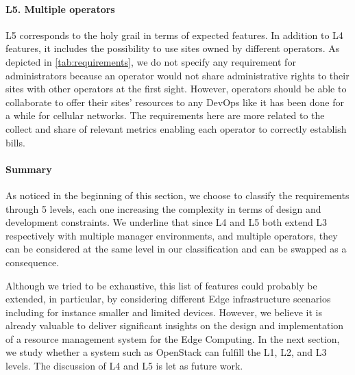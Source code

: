 \paragraph{L5. Multiple operators}
L5 corresponds to the holy grail in terms of expected features. In
addition to L4 features, it includes the possibility to use sites
owned by different operators. As depicted in \cref{tab:requirements},
we do not specify any requirement for administrators because an
operator would not share administrative rights to their sites with
other operators at the first sight. However, operators should be able
to collaborate to offer their sites' resources to any DevOps like it has
been done for a while for cellular networks. The requirements here are more
related to the collect and share of relevant metrics enabling each operator to
correctly establish bills.

\paragraph{Summary}
As noticed in the beginning of this section, we choose to classify the
requirements through 5 levels, each one increasing the complexity in
terms of design and development constraints. We underline that since
L4 and L5 both extend L3 respectively with multiple manager
environments, and multiple operators, they can be considered at the
same level in our classification and can be swapped as a consequence.

Although we tried to be exhaustive, this list of features could
probably be extended, in particular, by considering different Edge
infrastructure scenarios including for instance smaller and limited devices.
However, we believe it is already valuable to deliver significant
insights on the design and implementation of a resource management
system for the Edge Computing. In the next section, we study whether a
system such as OpenStack can fulfill the L1, L2, and L3 levels.
The discussion of L4 and L5 is let as future work.

